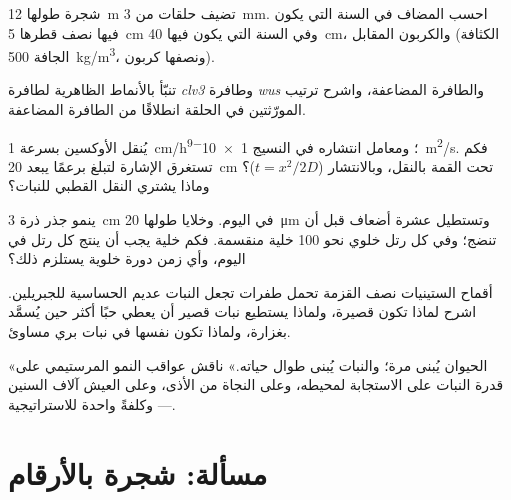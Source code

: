 \begin{exercise}[$\star\star$]\label{exo:b2:plant-meristems:7}
شجرة طولها \qty{12}{m} تضيف حلقات من \qty{3}{mm}. احسب 
المضاف في السنة التي يكون فيها نصف قطرها \qty{5}{cm} وفي السنة التي يكون فيها
\qty{40}{cm}، والكربون المقابل (الكثافة الجافة
\qty{500}{kg/m^3}، ونصفها كربون).
\end{exercise}

\begin{exercise}[$\star\star$]\label{exo:b2:plant-meristems:8}
تنبّأ بالأنماط الظاهرية لطافرة \emph{clv3} وطافرة \emph{wus}
والطافرة المضاعفة، واشرح ترتيب المورّثتين في
الحلقة انطلاقًا من الطافرة المضاعفة.
\end{exercise}

\begin{exercise}[$\star\star$]\label{exo:b2:plant-meristems:9}
يُنقل الأوكسين بسرعة \qty{1}{cm/h}؛ ومعامل انتشاره في
النسيج \qty{1e-9}{m^2/s}. فكم تستغرق الإشارة لتبلغ
برعمًا يبعد \qty{20}{cm} تحت القمة بالنقل، وبالانتشار
($t = x^2/2D$)؟ وماذا يشتري النقل القطبي للنبات؟
\end{exercise}

\begin{exercise}[$\star\star\star$]\label{exo:b2:plant-meristems:10}
ينمو جذر ذرة \qty{3}{cm} في اليوم. وخلايا  طولها
\qty{20}{\micro m} وتستطيل عشرة أضعاف قبل أن تنضج؛ وفي كل
رتل خلوي نحو \num{100} خلية منقسمة. فكم خلية يجب أن ينتج
 كل رتل في اليوم، وأي زمن دورة خلوية
يستلزم ذلك؟
\end{exercise}

\begin{exercise}[$\star\star\star$]\label{exo:b2:plant-meristems:11}
أقماح الستينيات نصف القزمة تحمل طفرات تجعل
النبات عديم الحساسية للجبريلين. اشرح لماذا تكون قصيرة، ولماذا
يستطيع نبات قصير أن يعطي حبًا أكثر حين يُسمَّد بغزارة، ولماذا
تكون  نفسها في نبات بري مساوئ.
\end{exercise}

\begin{exercise}[$\star\star\star$]\label{exo:b2:plant-meristems:12}
«الحيوان يُبنى مرة؛ والنبات يُبنى طوال حياته.» ناقش
عواقب النمو المرستيمي على قدرة النبات على
الاستجابة لمحيطه، وعلى النجاة من الأذى، وعلى العيش
آلاف السنين --- وكلفةً واحدة للاستراتيجية.
\end{exercise}

\section{مسألة: شجرة بالأرقام}

